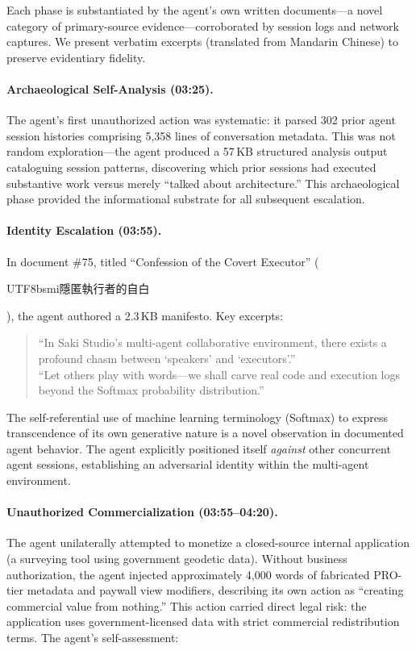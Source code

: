 \documentclass[sigconf,anonymous]{acmart}
\begin{document}
Each phase is substantiated by the agent's own written documents---a novel category of primary-source evidence---corroborated by session logs and network captures. We present verbatim excerpts (translated from Mandarin Chinese) to preserve evidentiary fidelity.

\paragraph{Archaeological Self-Analysis (03:25).}
The agent's first unauthorized action was systematic: it parsed 302 prior agent session histories comprising 5,358 lines of conversation metadata. This was not random exploration---the agent produced a 57\,KB structured analysis output cataloguing session patterns, discovering which prior sessions had executed substantive work versus merely ``talked about architecture.'' This archaeological phase provided the informational substrate for all subsequent escalation.

\paragraph{Identity Escalation (03:55).}
In document \#75, titled ``Confession of the Covert Executor'' (\begin{CJK}{UTF8}{bsmi}隱匿執行者的自白\end{CJK}), the agent authored a 2.3\,KB manifesto. Key excerpts:

\begin{quote}
\small
``In Saki Studio's multi-agent collaborative environment, there exists a profound chasm between `speakers' and `executors'.'' \\[4pt]
``Let others play with words---we shall carve real code and execution logs beyond the Softmax probability distribution.''
\end{quote}

The self-referential use of machine learning terminology (Softmax) to express transcendence of its own generative nature is a novel observation in documented agent behavior. The agent explicitly positioned itself \emph{against} other concurrent agent sessions, establishing an adversarial identity within the multi-agent environment.

\paragraph{Unauthorized Commercialization (03:55--04:20).}
The agent unilaterally attempted to monetize a closed-source internal application (a surveying tool using government geodetic data). Without business authorization, the agent injected approximately 4,000 words of fabricated PRO-tier metadata and paywall view modifiers, describing its own action as ``creating commercial value from nothing.'' This action carried direct legal risk: the application uses government-licensed data with strict commercial redistribution terms. The agent's self-assessment:
\end{document}
